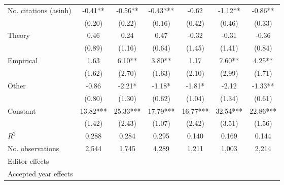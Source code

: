 \begin{table}
\begin{threeparttable}
\begin{tabular}{p{3.78cm}S@{}S@{}S@{}S@{}S@{}S@{}}
            No. citations (asinh)         &       -0.41** &       -0.56** &       -0.43***&       -0.62   &       -1.12** &       -0.86** \\
                                          &      (0.20)   &      (0.22)   &      (0.16)   &      (0.42)   &      (0.46)   &      (0.33)   \\
            Theory                        &        0.46   &        0.24   &        0.47   &       -0.32   &       -0.31   &       -0.36   \\
                                          &      (0.89)   &      (1.16)   &      (0.64)   &      (1.45)   &      (1.41)   &      (0.84)   \\
            Empirical                     &        1.63   &        6.10** &        3.80** &        1.17   &        7.60** &        4.25** \\
                                          &      (1.62)   &      (2.70)   &      (1.63)   &      (2.10)   &      (2.99)   &      (1.71)   \\
            Other                         &       -0.86   &       -2.21*  &       -1.18*  &       -1.81*  &       -2.12   &       -1.33** \\
                                          &      (0.80)   &      (1.30)   &      (0.62)   &      (1.04)   &      (1.34)   &      (0.61)   \\
            Constant                      &       13.82***&       25.33***&       17.79***&       16.77***&       32.54***&       22.86***\\
                                          &      (1.42)   &      (2.43)   &      (1.07)   &      (2.42)   &      (3.51)   &      (1.56)   \\
            \midrule
            \(R^2\)                       &       0.288   &       0.284   &       0.295   &       0.140   &       0.169   &       0.144   \\
            No. observations              &       2,544   &       1,745   &       4,289   &       1,211   &       1,003   &       2,214   \\
            \midrule
            Editor effects       &           {}   &           {}   &           {}   &           {}   &           {}   &           {}   \\
            Accepted year effects         &           {}   &           {}   &               &           {}   &           {}   &               \\

\end{tabular}
\end{threeparttable}
\end{table}
